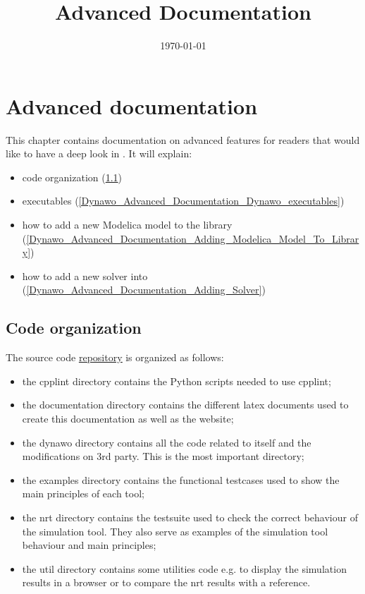 \documentclass[a4paper, 12pt]{report}
\begin{document}
\title{\Dynawo Advanced Documentation}
\date\today

\maketitle
\tableofcontents

\chapter{Advanced documentation}

This chapter contains documentation on advanced features for readers that would like to have a deep look in \Dynawo. It will explain:
\begin{itemize}
\item \Dynawo code organization (\ref{Dynawo_Advanced_Documentation_Code_Organization})
\item \Dynawo executables
(\ref{Dynawo_Advanced_Documentation_Dynawo_executables})
\item how to add a new Modelica model to the library (\ref{Dynawo_Advanced_Documentation_Adding_Modelica_Model_To_Library})
\item how to add a new solver into \Dynawo (\ref{Dynawo_Advanced_Documentation_Adding_Solver})
\end{itemize}

\section{Code organization}
\label{Dynawo_Advanced_Documentation_Code_Organization}

The \Dynawo source code \href{https://github.com/dynawo/dynawo.git}
{\underline{repository}} is organized as follows:
\begin{itemize}
\item the cpplint directory contains the Python scripts needed to use cpplint;
\item the documentation directory contains the different latex documents used to
create this documentation as well as the \Dynawo website;
\item the dynawo directory contains all the code related to \Dynawo itself and
the modifications on 3rd party. This is the most important directory;
\item the examples directory contains the functional testcases used to show the main principles of each tool;
\item the nrt directory contains the testsuite used to check the correct
behaviour of the simulation tool. They also serve as examples of the simulation
tool behaviour and main principles;
\item the util directory contains some utilities code e.g. to display the
simulation results in a browser or to compare the nrt
results with a reference.
\end{itemize}
\end{document}
